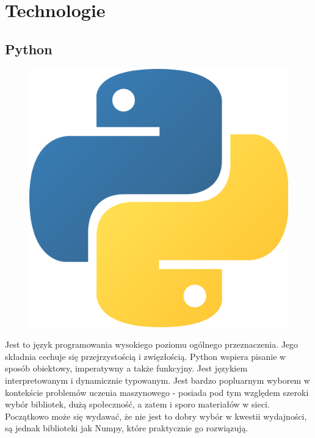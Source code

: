 \newpage
\section{Technologie}

\subsection{Python}
\begin{figure}
\vspace{-4mm}
\includegraphics[width=\linewidth]{./images/python.png}
\vspace{-4mm}
\end{figure}
Jest to język programowania wysokiego poziomu ogólnego przeznaczenia.
Jego składnia cechuje się przejrzystością i zwięzłością. Python wspiera pisanie w sposób obiektowy, 
imperatywny a także funkcyjny. Jest językiem interpretowanym i dynamicznie typowanym. Jest bardzo popluarnym 
wyborem w kontekście problemów uczenia maszynowego - posiada pod tym względem szeroki wybór bibliotek, 
dużą społeczność, a zatem i sporo materiałów w sieci.
Początkowo może się wydawać, że nie jest to dobry wybór w kwestii wydajności, 
są jednak biblioteki jak Numpy, które praktycznie go rozwiązują.

